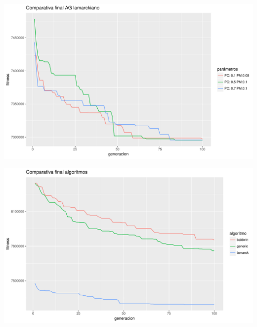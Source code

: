 \documentclass[10pt,a4paper]{article}
\begin{document}
\includegraphics[width = \textwidth]{img/graphics/GAlamarckFinal.pdf}

\includegraphics[width = \textwidth]{img/graphics/final.pdf}
\end{document}
